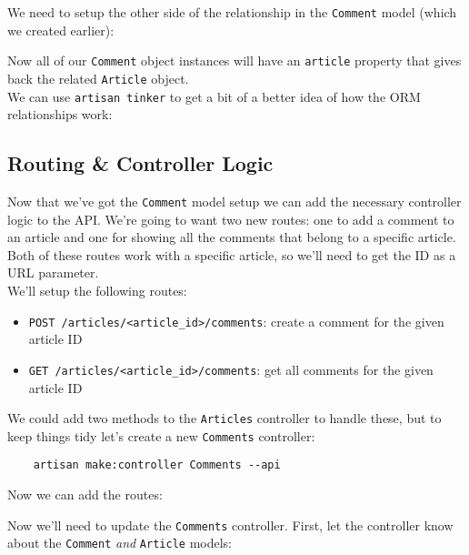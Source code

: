 We need to setup the other side of the relationship in the \texttt{Comment} model (which we created earlier):


Now all of our \texttt{Comment} object instances will have an \texttt{article} property that gives back the related \texttt{Article} object.
\\

We can use \texttt{artisan tinker} to get a bit of a better idea of how the ORM relationships work:



\subsection{Routing \& Controller Logic}

Now that we've got the \texttt{Comment} model setup we can add the necessary controller logic to the API. We're going to want two new routes: one to add a comment to an article and one for showing all the comments that belong to a specific article. Both of these routes work with a specific article, so we'll need to get the ID as a URL parameter.
\\

We'll setup the following routes:

\begin{itemize}
    \item \texttt{POST /articles/<article\_id>/comments}: create a comment for the given article ID
    \item \texttt{GET /articles/<article\_id>/comments}: get all comments for the given article ID
\end{itemize}

We could add two methods to the \texttt{Articles} controller to handle these, but to keep things tidy let's create a new \texttt{Comments} controller:

\begin{verbatim}
    artisan make:controller Comments --api
\end{verbatim}

Now we can add the routes:


\pagebreak

Now we'll need to update the \texttt{Comments} controller. First, let the controller know about the \texttt{Comment} \textit{and} \texttt{Article} models:

